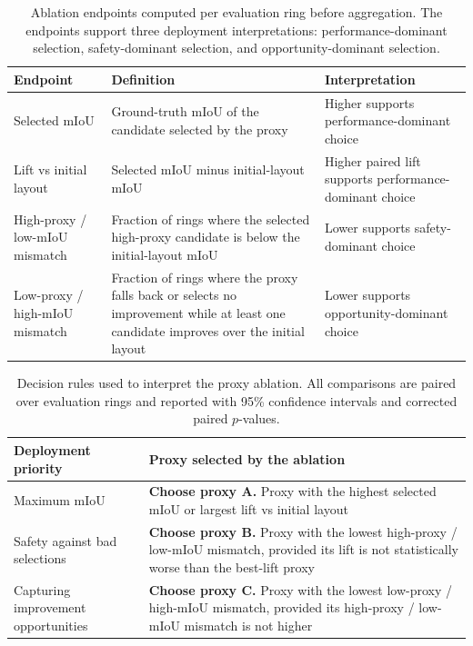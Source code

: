 \documentclass[a4paper,fleqn]{cas-dc}
\begin{document}
{\begin{table}[t]
\caption{Ablation endpoints computed per evaluation ring before aggregation. The endpoints support three deployment interpretations: performance-dominant selection, safety-dominant selection, and opportunity-dominant selection.}
\label{tab:proxy_ablation_metrics}
\centering
\footnotesize
\begin{tabular}{p{}p{}p{}}
\toprule
Endpoint & Definition & Interpretation \\
\midrule
Selected mIoU & Ground-truth mIoU of the candidate selected by the proxy & Higher supports performance-dominant choice \\
Lift vs initial layout & Selected mIoU minus initial-layout mIoU & Higher paired lift supports performance-dominant choice \\
High-proxy / low-mIoU mismatch & Fraction of rings where the selected high-proxy candidate is below the initial-layout mIoU & Lower supports safety-dominant choice \\
Low-proxy / high-mIoU mismatch & Fraction of rings where the proxy falls back or selects no improvement while at least one candidate improves over the initial layout & Lower supports opportunity-dominant choice \\
\bottomrule
\end{tabular}
\end{table}

\begin{table}[t]
\caption{Decision rules used to interpret the proxy ablation. All comparisons are paired over evaluation rings and reported with 95\% confidence intervals and corrected paired $p$-values.}
\label{tab:proxy_ablation_interpretation}
\centering
\footnotesize
\begin{tabular}{p{}p{}}
\toprule
Deployment priority & Proxy selected by the ablation \\
\midrule
Maximum mIoU & \textbf{Choose proxy A.} Proxy with the highest selected mIoU or largest lift vs initial layout \\
Safety against bad selections & \textbf{Choose proxy B.} Proxy with the lowest high-proxy / low-mIoU mismatch, provided its lift is not statistically worse than the best-lift proxy \\
Capturing improvement opportunities & \textbf{Choose proxy C.} Proxy with the lowest low-proxy / high-mIoU mismatch, provided its high-proxy / low-mIoU mismatch is not higher \\
\bottomrule
\end{tabular}
\end{table}

}
\end{document}

